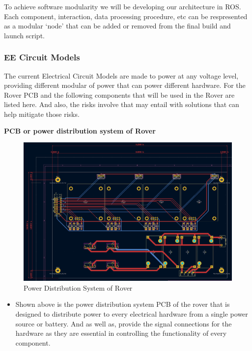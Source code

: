 \documentclass[a4paper, 10pt]{article}
\begin{document}
 	To achieve software modularity we will be developing our architecture in ROS. Each component, interaction, data processing procedure, etc can be respresented as a modular `node' that can be added or removed from the final build and launch script.
 		
 		\subsubsection{EE Circuit Models}

	The current Electrical Circuit Models are made to power at any voltage level, providing different modular of power that can power different hardware. For the Rover PCB and the following components that will be used in the Rover are listed here. And also, the risks involve that may entail with solutions that can help mitigate those risks. 
 		
 	\textbf{PCB or power distribution system of Rover}

\begin{figure} [h]
			\centering
			\includegraphics[scale=0.15]{Photos/Rover PCB}
			\caption{Power Distribution System of Rover}
		\end{figure}

\begin{itemize}
\item
	Shown above is the power distribution system PCB of the rover that is designed to distribute power to every electrical hardware from a single power source or battery. And as well as, provide the signal connections for the hardware as they are essential in controlling the functionality of every component. 
\end{itemize}
\end{document}
